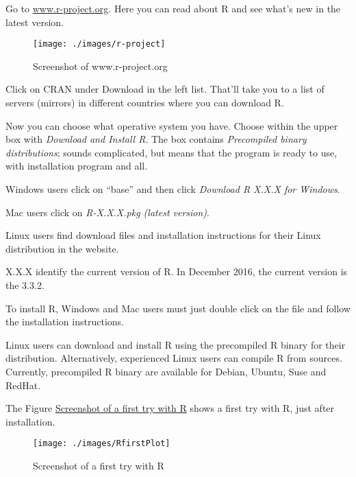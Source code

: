 \documentclass[]{book}
\begin{document}
Go to \href{http://www.r-project.org/}{www.r-project.org}. Here you can
read about R and see what's new in the latest version.

\begin{figure}[h]

{\centering \texttt{[image: ./images/r-project]} 

}

\caption{Screenshot of www.r-project.org}\label{fig:g1}
\end{figure}

Click on CRAN under Download in the left list. That'll take you to a
list of servers (mirrors) in different countries where you can download
R.

Now you can choose what operative system you have. Choose within the
upper box with \emph{Download and Install R}. The box contains
\emph{Precompiled binary distributions}; sounds complicated, but means
that the program is ready to use, with installation program and all.

Windows users click on ``base'' and then click \emph{Download R X.X.X
for Windows}.

Mac users click on \emph{R-X.X.X.pkg (latest version)}.

Linux users find download files and installation instructions for their
Linux distribution in the website.

X.X.X identify the current version of R. In December 2016, the current
version is the 3.3.2.

To install R, Windows and Mac users must just double click on the file
and follow the installation instructions.

Linux users can download and install R using the precompiled R binary
for their distribution. Alternatively, experienced Linux users can
compile R from sources. Currently, precompiled R binary are available
for Debian, Ubuntu, Suse and RedHat.

The Figure \protect\hyperlink{fig:ssFirsttry}{Screenshot of a first try
with R} shows a first try with R, just after installation.

\hypertarget{fig:ssFirsttry}{}
\begin{figure}[h]

{\centering \texttt{[image: ./images/RfirstPlot]} 

}

\caption{Screenshot of a first try with R}\label{fig:g2}
\end{figure}
\end{document}
